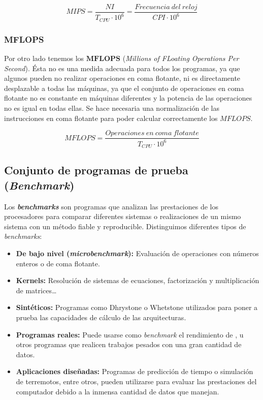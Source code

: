 \[MIPS=\frac{NI}{T_{CPU}\cdot10^6}=\frac{Frecuencia\ del\ reloj}{CPI\cdot10^6}\]

\subsubsection{MFLOPS}

Por otro lado tenemos los $\boldsymbol{MFLOPS}$ (\textit{Millions of FLoating Operations Per Second}).
Ésta no es una medida adecuada para todos los programas, ya que algunos pueden no realizar operaciones en coma flotante, ni es directamente desplazable a todas las máquinas, ya que el conjunto de operaciones en coma flotante no es constante en máquinas diferentes y la potencia de las operaciones no es igual en todas ellas.
Se hace necesaria una normalización de las instrucciones en coma flotante para poder calcular correctamente los $MFLOPS$.

\[MFLOPS=\frac{Operaciones\ en\ coma\ flotante}{T_{CPU}\cdot10^6}\]

\subsection{Conjunto de programas de prueba (\textit{Benchmark})}\label{benchmark}

Los \textbf{\textit{benchmarks}} son programas que analizan las prestaciones de los procesadores para comparar diferentes sistemas o realizaciones de un mismo sistema con un método fiable y reproducible.
Distinguimos diferentes tipos de \textit{benchmarks}:

\begin{itemize}
	\item\textbf{De bajo nivel (\textit{microbenchmark}):} Evaluación de operaciones con números enteros o de coma flotante.
	\item\textbf{Kernels:} Resolución de sistemas de ecuaciones, factorización y multiplicación de matrices\ldots
	\item\textbf{Sintéticos:} Programas como Dhrystone o Whetstone utilizados para poner a prueba las capacidades de cálculo de las arquitecturas.
	\item\textbf{Programas reales:} Puede usarse como \textit{benchmark} el rendimiento de ,  u otros programas que realicen trabajos pesados con una gran cantidad de datos.
	\item\textbf{Aplicaciones diseñadas:} Programas de predicción de tiempo o simulación de terremotos, entre otros, pueden utilizarse para evaluar las prestaciones del computador debido a la inmensa cantidad de datos que manejan.
\end{itemize}

